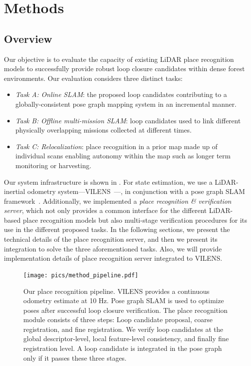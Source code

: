 \chapter{Methods}
\label{ch:methods}

\section{Overview}
\label{sec:overview}
Our objective is to evaluate the capacity of existing LiDAR place recognition models to successfully provide robust loop closure candidates within dense forest environments. Our evaluation considers three distinct tasks: 
\begin{itemize}
  \listparindent=-20pt
  \item \emph{Task A: Online SLAM}: the proposed loop candidates contributing to a globally-consistent pose graph mapping system in an incremental manner.
  \item \emph{Task B: Offline multi-mission SLAM}: loop candidates used to link different physically overlapping missions collected at different times.
  \item \emph{Task C: Relocalization}: place recognition in a prior map made up of individual scans enabling autonomy within the map such as longer term monitoring or harvesting.
\end{itemize}

Our system infrastructure is shown in . For state estimation, we use a LiDAR-inertial odometry system---VILENS~\cite{wisth2023tro}---, in conjunction with a pose graph SLAM framework~\cite{proudman2022ras}. Additionally, we implemented a \emph{place recognition \& verification server}, which not only provides a common interface for the different LiDAR-based place recognition models but also multi-stage verification procedures for its use in the different proposed tasks.
In the following sections, we present the technical details of the place recognition server, and then we present its integration to solve the three aforementioned tasks. Also, we will provide implementation details of place recognition server integrated to VILENS. 


\begin{figure}[t]
  \centering
  \texttt{[image: pics/method\_pipeline.pdf]}
  \caption{Our place recognition pipeline. VILENS provides a continuous odometry estimate at 10 Hz. Pose graph SLAM is used to optimize poses after successful loop closure verification. 
  The place recognition module consists of three steps: Loop candidate proposal, coarse registration, and fine registration. We verify loop candidates
  at the global descriptor-level, local feature-level consistency, and finally fine registration level. A loop candidate is integrated in the pose graph only if it passes these three stages.}
  \label{fig:pipeline}
\end{figure}


